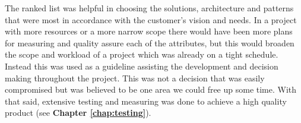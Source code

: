 The ranked list was helpful in choosing the solutions, architecture and patterns that were most in accordance with the customer's vision and needs. In a project with more resources or a more narrow scope there would have been more plans for measuring and quality assure each of the attributes, but this would broaden the scope and workload of a project which was already on a tight schedule. Instead this was used as a guideline assisting the development and decision making throughout the project. This was not a decision that was easily compromised but was believed to be one area we could free up some time. With that said, extensive testing and measuring was done to achieve a high quality product (see \textbf{Chapter \ref{chap:testing}}).\newline






